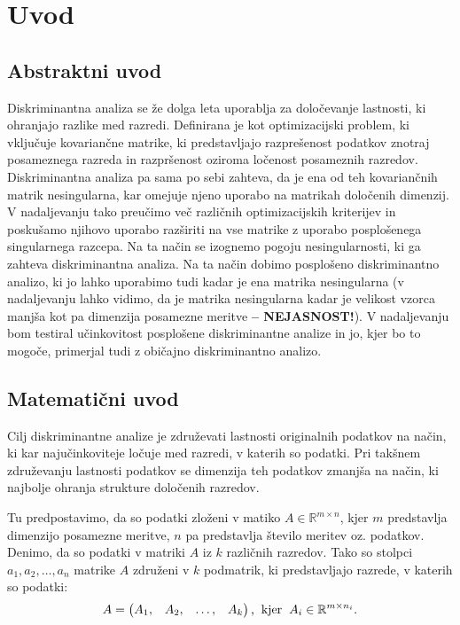\documentclass[mat1]{article}
\begin{document}
\section{Uvod}

\subsection{Abstraktni uvod}
Diskriminantna analiza se že dolga leta uporablja za določevanje lastnosti, ki ohranjajo razlike med razredi. Definirana je kot optimizacijski problem, ki vključuje kovariančne matrike, ki predstavljajo razprešenost podatkov znotraj posameznega razreda in razpršenost oziroma ločenost posameznih razredov. Diskriminantna analiza pa sama po sebi zahteva, da je ena od teh kovariančnih matrik nesingularna, kar omejuje njeno uporabo na matrikah določenih dimenzij. V nadaljevanju tako preučimo več različnih optimizacijskih kriterijev in poskušamo njihovo uporabo razširiti na vse matrike z uporabo posplošenega singularnega razcepa. Na ta način se izognemo pogoju nesingularnosti, ki ga zahteva diskriminantna analiza. Na ta način dobimo posplošeno diskriminantno analizo, ki jo lahko uporabimo tudi kadar je ena matrika nesingularna (v nadaljevanju lahko vidimo, da je matrika nesingularna kadar je velikost vzorca manjša kot pa dimenzija posamezne meritve  \textbf{-- NEJASNOST!}). V nadaljevanju bom testiral učinkovitost posplošene diskriminantne analize in jo, kjer bo to mogoče, primerjal tudi z običajno diskriminantno analizo.

\subsection{Matematični uvod}
Cilj diskriminantne analize je združevati lastnosti originalnih podatkov na način, ki kar najučinkoviteje ločuje med razredi, v katerih so podatki. Pri takšnem združevanju lastnosti podatkov se dimenzija teh podatkov zmanjša na način, ki najbolje ohranja strukture določenih razredov.  

Tu predpostavimo, da so podatki zloženi v matiko $A \in \mathbb{R}^{m \times n}$, kjer $m$ predstavlja dimenzijo posamezne meritve, $n$ pa predstavlja število meritev oz. podatkov. Denimo, da so podatki v matriki $A$ iz $k$ različnih razredov. Tako so stolpci $a_1, a_2, \ldots, a_n$ matrike $A$ združeni v $k$ podmatrik, ki predstavljajo razrede, v katerih so podatki:
$$ A = 
\begin{pmatrix}
A_1, & A_2, & \ldots, & A_k
\end{pmatrix} \text{,}
\hspace{2mm} \text{kjer} \hspace{2mm} A_i \in \mathbb{R}^{m \times n_i} \text{.}
$$ 
\end{document}
